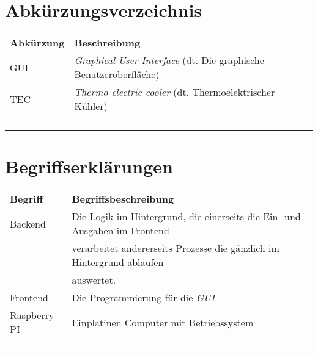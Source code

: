 \section*{Abkürzungsverzeichnis}

\begin{table}[H]
    \begin{tabular}{l|l}
         \textbf{Abkürzung}& \textbf{Beschreibung}\\
         GUI& \textit{Graphical User Interface} (dt. Die graphische Benutzeroberfläche)\\
         TEC& \textit{Thermo electric cooler} (dt. Thermoelektrischer Kühler)\\
         & \\
         & \\
         & \\
         & \\
    \end{tabular}
    \label{tab:my_label}
\end{table}

\section*{Begriffserklärungen}
\begin{table}[H]
    \begin{tabular}{l|l}
         \textbf{Begriff}& \textbf{Begriffsbeschreibung}\\
         Backend& Die Logik im Hintergrund, die einerseits die Ein- und Ausgaben im Frontend\\
         &verarbeitet andererseits Prozesse die gänzlich im Hintergrund ablaufen\\
         &auswertet.\\         
         Frontend& Die Programmierung für die \textit{GUI}.\\
         Raspberry PI& Einplatinen Computer mit Betriebssystem\\
         & \\
         & \\
         & \\
    \end{tabular}
    \label{tab:my_label}
\end{table}